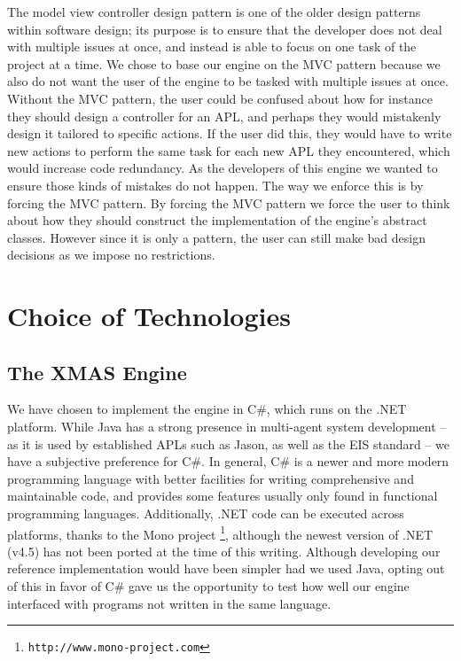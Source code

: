 The model view controller design pattern is one of the older design
patterns within software design; its purpose is to ensure that the
developer does not deal with multiple issues at once, and instead
is able to focus on one task of the project at a time. We chose to
base our engine on the MVC pattern because we also do not want the
user of the engine to be tasked with multiple issues at once. Without
the MVC pattern, the user could be confused about how for instance
they should design a controller for an APL, and perhaps they would
mistakenly design it tailored to specific actions. If the user did
this, they would have to write new actions to perform the same task
for each new APL they encountered, which would increase code redundancy.
As the developers of this engine we wanted to ensure those kinds of
mistakes do not happen. The way we enforce this is by forcing the
MVC pattern. By forcing the MVC pattern we force the user to think
about how they should construct the implementation of the engine\textquoteright{}s
abstract classes. However since it is only a pattern, the user can
still make bad design decisions as we impose no restrictions. 


\section{Choice of Technologies}


\subsection*{The XMAS Engine}

We have chosen to implement the engine in C\#, which runs on the .NET
platform. While Java has a strong presence in multi-agent system development
-- as it is used by established APLs such as Jason, as well as the
EIS standard -- we have a subjective preference for C\#. In general,
C\# is a newer and more modern programming language with better facilities
for writing comprehensive and maintainable code, and provides some
features usually only found in functional programming languages. Additionally,
.NET code can be executed across platforms, thanks to the Mono project%
\footnote{\texttt{http://www.mono-project.com}%
}, although the newest version of .NET (v4.5) has not been ported at
the time of this writing. Although developing our reference implementation
would have been simpler had we used Java, opting out of this in favor
of C\# gave us the opportunity to test how well our engine interfaced
with programs not written in the same language. 


